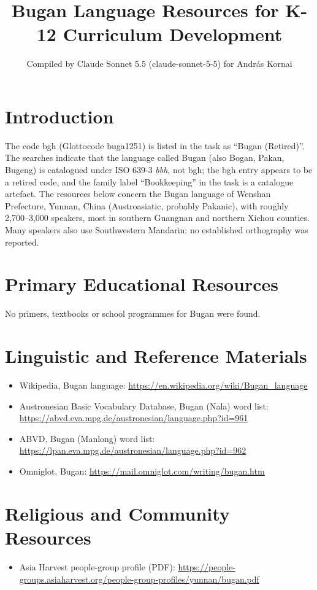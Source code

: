\documentclass[12pt]{article}
\title{Bugan Language Resources for K-12 Curriculum Development}
\author{Compiled by Claude Sonnet 5.5 (claude-sonnet-5-5) for Andr\'as Kornai}
\date{}
\begin{document}
\maketitle

\section{Introduction}
The code bgh (Glottocode buga1251) is listed in the task as ``Bugan (Retired)''. The searches indicate that the language called Bugan (also Bogan, Pakan, Bugeng) is catalogued under ISO 639-3 \emph{bbh}, not bgh; the bgh entry appears to be a retired code, and the family label ``Bookkeeping'' in the task is a catalogue artefact. The resources below concern the Bugan language of Wenshan Prefecture, Yunnan, China (Austroasiatic, probably Pakanic), with roughly 2,700--3,000 speakers, most in southern Guangnan and northern Xichou counties. Many speakers also use Southwestern Mandarin; no established orthography was reported.

\section{Primary Educational Resources}
No primers, textbooks or school programmes for Bugan were found.

\section{Linguistic and Reference Materials}
\begin{itemize}
\item Wikipedia, Bugan language: \url{https://en.wikipedia.org/wiki/Bugan_language}
\item Austronesian Basic Vocabulary Database, Bugan (Nala) word list: \url{https://abvd.eva.mpg.de/austronesian/language.php?id=961}
\item ABVD, Bugan (Manlong) word list: \url{https://lpan.eva.mpg.de/austronesian/language.php?id=962}
\item Omniglot, Bugan: \url{https://mail.omniglot.com/writing/bugan.htm}
\end{itemize}

\section{Religious and Community Resources}
\begin{itemize}
\item Asia Harvest people-group profile (PDF): \url{https://people-groups.asiaharvest.org/people-group-profiles/yunnan/bugan.pdf}
\end{itemize}
\end{document}
